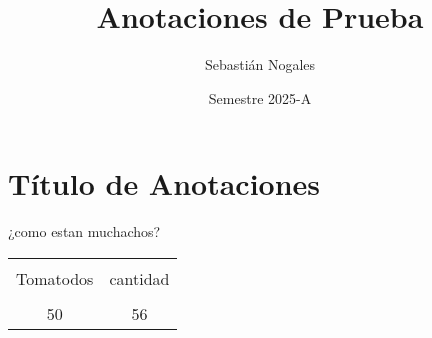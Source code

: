 \documentclass{report}
\title{Anotaciones de Prueba}
\date{Semestre 2025-A}
\author{Sebastián Nogales}
\begin{document}
\section{Título de Anotaciones}

¿como estan muchachos?
\begin{tabular}{|c|c|}
\centering
\\Tomatodos & cantidad\\
\\50        & 56\\    
\end{tabular}
\end{document}

